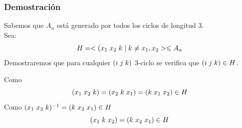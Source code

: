 \documentclass[11pt,a4paper]{article}
\begin{document}
\subsubsection*{Demostración}

Sabemos que $A_{n}$ está generado por todos los ciclos de longitud 3. \\
Sea:
$$H = <(x_{1} \hspace{0.1cm} x_{2} \hspace{0.1cm} k \mid k \neq x_{1}, x_{2}> \leqslant A_{n}$$
Demostraremos que para cualquier $(i \hspace{0.1cm} j \hspace{0.1cm} k)$ 3-ciclo se verifica que $(i \hspace{0.1cm} j \hspace{0.1cm} k) \in H$.

Como
$$(x_{1} \hspace{0.1cm} x_{2} \hspace{0.1cm} k) = (x_{2} \hspace{0.1cm} k \hspace{0.1cm} x_{1}) = (k \hspace{0.1cm} x_{1} \hspace{0.1cm} x_{2}) \in H$$
Como $(x_{1} \hspace{0.1cm} x_{2} \hspace{0.1cm} k)^{-1} = (k \hspace{0.1cm} x_{2} \hspace{0.1cm} x_{1}) \in H$
$$(x_{1} \hspace{0.1cm} k \hspace{0.1cm} x_{2}) = (k \hspace{0.1cm} x_{2} \hspace{0.1cm} x_{1}) \in H$$
\end{document}
